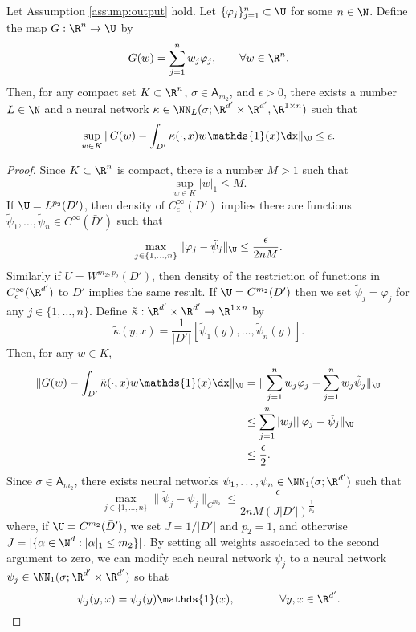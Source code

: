 \begin{lemma}
\label{lemma:output_approx}
Let Assumption \ref{assump:output} hold. Let \(\{\varphi_j\}_{j=1}^n \subset \U\) for some \(n \in \N\).
Define the map \(G : \R^n \to \U\) by 
\[G(w) = \sum_{j=1}^n w_j \varphi_j, \qquad \forall w \in \R^n.\]
Then, for any compact set \(K \subset \R^n\), \(\sigma \in \mathsf{A}_{m_2}\), and \(\epsilon > 0\), there exists 
a number \(L \in \N\) and a neural network \(\kappa \in \NN_L(\sigma;\R^{d'} \times \R^{d'},\R^{1 \times n})\) such that
\[\sup_{w \in K} \|G(w) - \int_{D'} \kappa(\cdot, x) w \mathds{1}(x) \dx \|_\U \leq \epsilon. \]
\end{lemma}
\begin{proof}
Since \(K \subset \R^n\) is compact, there is a number \(M > 1\) such that
\[\sup_{w \in K} |w|_1 \leq M.\]
If \(\U = L^{p_2}(D')\), then density of \(C^\infty_c (D')\) implies there are 
functions \(\tilde{\psi}_1, \dots, \tilde{\psi}_n \in C^\infty (\bar{D}')\) such that
\[\max_{j \in \{1,\dots,n\}} \|\varphi_j - \tilde{\psi}_j \|_\U \leq \frac{\epsilon}{2nM}.\]
Similarly if \(U = W^{m_2, p_2}(D')\), then density of the restriction of functions in \(C^{\infty}_c (\R^{d'})\)
to \(D'\) \cite[Theorem 11.35]{leoni2009first} implies the same result.
If \(\U = C^{m_2}(\bar{D}')\) then we set \(\tilde{\psi}_j = \varphi_j\) for any \(j \in \{1,\dots,n\}\).
Define \(\tilde{\kappa} : \R^{d'} \times \R^{d'} \to \R^{1 \times n}\) by 
\[\tilde{\kappa}(y,x) = \frac{1}{|D'|} [\tilde{\psi}_1(y), \dots, \tilde{\psi}_n (y)].\]
Then, for any \(w \in K\), 
\begin{align*}
\|G(w) - \int_{D'} \tilde{\kappa}(\cdot,x) w \mathds{1}(x) \dx \|_\U &= \| \sum_{j=1}^n w_j \varphi_j - \sum_{j=1}^n w_j \tilde{\psi}_j \|_\U \\
&\leq \sum_{j=1}^n  |w_j| \|\varphi_j - \tilde{\psi}_j\|_\U \\
&\leq \frac{\epsilon}{2}.
\end{align*}
Since \(\sigma \in \mathsf{A}_{m_2}\), there exists neural networks \(\psi_1,\dots,\psi_n \in \NN_1(\sigma;\R^{d'})\) such that
\[\max_{j \in \{1,\dots,n\}}\| \tilde{\psi}_j - \psi_j \|_{C^{m_2}} \leq \frac{\epsilon}{2nM(J|D'|)^{\frac{1}{p_2}}}\]
where, if \(\U = C^{m_2}(\bar{D}')\), we set \(J = 1/|D'|\) and \(p_2=1\), and otherwise \(J = |\{\alpha \in \N^d : |\alpha|_1 \leq m_2 \}|\). By setting all weights associated to the second argument to zero, 
we can modify each neural network \(\psi_j\)
to a neural network \(\psi_j \in \NN_1(\sigma;\R^{d'} \times \R^{d'})\) so that
\[\psi_j(y,x) = \psi_j(y) \mathds{1}(x), \qquad \qquad \forall y,x \in \R^{d'}.\]

\end{proof}
